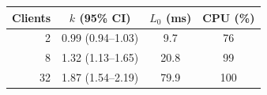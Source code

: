 \begin{tabular}{rccc}
\toprule
Clients & $k$ (95\% CI) & $L_0$ (ms) & CPU (\%) \\
\midrule
2 & 0.99 (0.94--1.03) & 9.7 & 76 \\
8 & 1.32 (1.13--1.65) & 20.8 & 99 \\
32 & 1.87 (1.54--2.19) & 79.9 & 100 \\
\bottomrule
\end{tabular}
